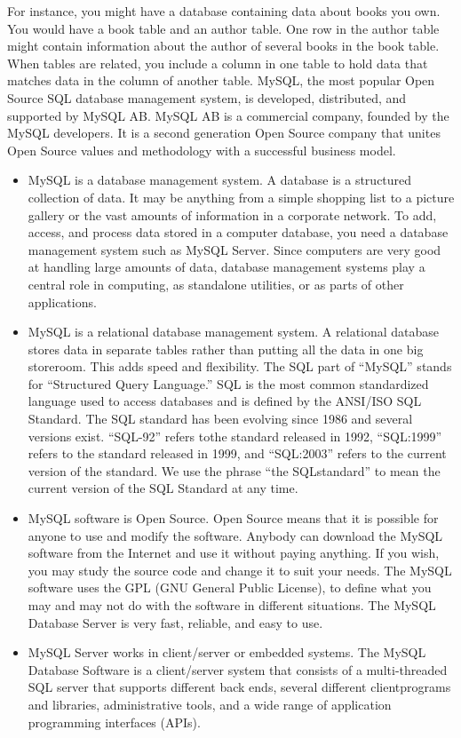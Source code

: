 For instance, you might have a database containing data about books you own. You would have a book table and an author table. One row in the author table might contain information about the author of several books in the book table. When tables are related, you include a column in one table to hold data that matches data in the column of another table. MySQL, the most popular Open Source SQL database management system, is developed, distributed, and supported by MySQL AB. MySQL AB is a commercial company, founded by the MySQL developers. It is a second generation Open Source company that unites Open Source values and methodology with a successful business model.
\pagestyle{fancy}
\begin{itemize}
	\item MySQL is a database management system. A database is a structured collection of data. It may be anything from a simple shopping list to a picture gallery or the vast	amounts of information in a corporate network. To add, access, and process data stored in a computer database, you need a database management system such as	MySQL Server. Since computers are very good at handling large amounts of data,
	database management systems play a central role in computing, as standalone utilities, or as parts of other applications.
	
	\item MySQL is a relational database management system. A relational database stores data in separate tables rather than putting all the data in one big storeroom. This adds speed and flexibility. The SQL part of “MySQL” stands for “Structured Query Language.” SQL is the most common standardized language used to access databases and is defined by the ANSI/ISO SQL Standard. The SQL standard has been evolving since 1986 and several versions exist. “SQL-92” refers tothe standard released in	1992, “SQL:1999” refers to the standard released in 1999, and “SQL:2003” refers to the current version of the standard. We use the phrase “the SQLstandard” to mean the current version of the SQL Standard at any time.
	
	\item MySQL software is Open Source. Open Source means that it is possible for anyone to use and modify the software. Anybody can download the MySQL software from the Internet and use it without paying anything. If you wish, you may study the source code and change it to suit your needs. The MySQL software uses the GPL (GNU General Public License), to define what you may and may not do with the software in
	different situations. The MySQL Database Server is very fast, reliable, and easy to use.
	
	\item MySQL Server works in client/server or embedded systems. The MySQL Database Software is a client/server system that consists of a multi-threaded SQL server that supports different back ends, several different clientprograms and libraries, administrative tools, and a wide range of application programming interfaces (APIs).
	\end{itemize}

\thispagestyle{fancy}
